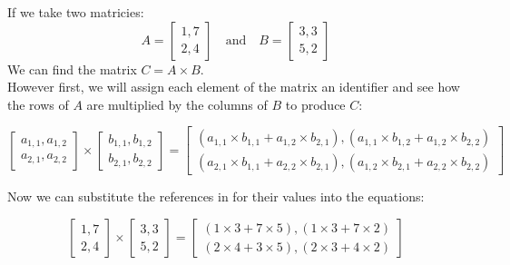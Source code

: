 If we take two matricies:
\begin{equation*}
    A = 
    \begin{bmatrix}
        1, 7\\
        2, 4
    \end{bmatrix}
    \quad \mathrm{and} \quad
    B = 
    \begin{bmatrix}
        3, 3\\
        5, 2
    \end{bmatrix}
\end{equation*}
We can find the matrix $C = A \times B$. \\

However first, we will assign each element of the matrix an identifier and see how the rows of $A$ are multiplied by the columns of $B$ to produce $C$:

\begin{equation*}
    \begin{bmatrix}
        a_{1,1}, a_{1,2}\\
        a_{2,1}, a_{2,2}
    \end{bmatrix}
    \times
    \begin{bmatrix}
        b_{1,1}, b_{1,2}\\
        b_{2,1}, b_{2,2}
    \end{bmatrix}
    = 
    \begin{bmatrix}
        (a_{1, 1} \times b_{1, 1} + a_{1, 2} \times b_{2, 1}), (a_{1, 1} \times b_{1, 2} + a_{1, 2} \times b_{2, 2})\\
        (a_{2, 1} \times b_{1, 1} + a_{2, 2} \times b_{2, 1}), (a_{1, 2} \times b_{2, 1} + a_{2, 2} \times b_{2, 2})
    \end{bmatrix}
\end{equation*}

Now we can substitute the references in for their values into the equations:

\begin{equation*}
    \begin{bmatrix}
        1, 7\\
        2, 4
    \end{bmatrix}
    \times
    \begin{bmatrix}
        3, 3\\
        5, 2
    \end{bmatrix}
    =
    \begin{bmatrix}
        (1 \times 3 + 7 \times 5), (1 \times 3 + 7 \times 2)\\ 
        (2 \times 4 + 3 \times 5), (2 \times 3 + 4 \times 2)
    \end{bmatrix}
\end{equation*}

